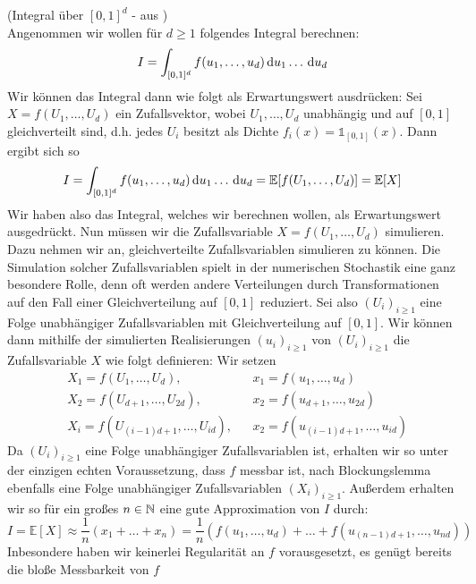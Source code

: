 \begin{Beispiel}(Integral über $ [0,1]^d $ - aus \cite{lapeyre2003introduction})\\
	\label{BeispielIntegral}
	Angenommen wir wollen für $ d \geq 1 $ folgendes Integral berechnen:
	\[
		I = \int_{[0,1]^d} f(u_1,\dots,u_d) \, \mathrm{d} u_1\dots\, \mathrm{d} u_d
	\]
	Wir können das Integral dann wie folgt als Erwartungswert ausdrücken:
	Sei $ X = f(U_1,\dots,U_d) $ ein 
	Zufallsvektor, wobei $ U_1,\dots,U_d $ unabhängig und auf $ [0,1] $ gleichverteilt sind, d.h. jedes $ U_i $ besitzt als Dichte $ f_i(x) = \mathds{1}_{[0,1]}(x) $.
	Dann ergibt sich so 
	\[
		I = \int_{[0,1]^d} f(u_1,\dots,u_d) \, \mathrm{d} u_1\dots\, \mathrm{d} u_d = \mathbb{E}[f(U_1,\dots,U_d)] = \mathbb{E}[X]
	\]
	Wir haben also das Integral, welches wir berechnen wollen, als Erwartungswert ausgedrückt. Nun müssen wir die Zufallsvariable $ X = f(U_1,\dots,U_d) $ simulieren.
	Dazu nehmen wir an, gleichverteilte Zufallsvariablen simulieren zu können. Die Simulation solcher Zufallsvariablen spielt in der numerischen Stochastik eine ganz besondere Rolle, denn oft werden andere Verteilungen durch Transformationen auf den Fall einer Gleichverteilung auf $ [0,1] $ reduziert.
	Sei also $ (U_i)_{i \geq 1} $ eine Folge unabhängiger Zufallsvariablen mit Gleichverteilung auf $ [0,1] $. Wir können dann mithilfe der simulierten Realisierungen $ (u_i)_{i \geq 1} $  von $ (U_i)_{i \geq 1} $ die Zufallsvariable $ X $ wie folgt definieren: Wir setzen
	\begin{align*}
		&X_1 = f(U_1,\dots,U_d), & &x_1 = f(u_1,\dots,u_d) \\
		&X_2 = f(U_{d+1},\dots,U_{2d}), & &x_2 = f(u_{d+1},\dots,u_{2d}) \\
		&X_i = f(U_{(i-1)d+1},\dots,U_{id}), & &x_2 = f(u_{(i-1)d+1},\dots,u_{id})
	\end{align*}
	Da $ (U_i)_{i \geq 1} $ eine Folge unabhängiger Zufallsvariablen ist, erhalten wir so unter der einzigen echten Voraussetzung, dass $ f $ messbar ist, nach Blockungslemma ebenfalls eine Folge unabhängiger Zufallsvariablen $ (X_i)_{i \geq 1} $.
	Außerdem erhalten wir so für ein großes $ n \in \mathbb{N} $ eine gute Approximation von $ I $ durch:
	\[
		I = \mathbb{E}[X] \approx \frac{1}{n}(x_1+\dots+x_n) = \frac{1}{n} (f(u_1,\dots,u_d)+\dots+f(u_{(n-1)d+1},\dots,u_{nd}))
	\]	
	Inbesondere haben wir keinerlei Regularität an $ f $ vorausgesetzt, es genügt bereits die bloße Messbarkeit von $ f $
\end{Beispiel}



